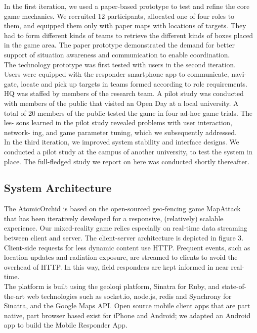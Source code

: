 In the first iteration, we used a paper-based prototype to test and refine the core game mechanics. We recruited 12 participants, allocated one of four roles to them, and equipped them only with paper maps with locations of targets. They had to form different kinds of teams to retrieve the different kinds of boxes placed in the game area. The paper prototype demonstrated the demand for better support of situation awareness and communication to enable coordination.\\

The technology prototype was first tested with users in the second iteration. Users were equipped with the responder smartphone app to communicate, navi- gate, locate and pick up targets in teams formed according to role requirements. HQ was staffed by members of the research team. A pilot study was conducted with members of the public that visited an Open Day at a local university. A total of 20 members of the public tested the game in four ad-hoc game trials. The les- sons learned in the pilot study revealed problems with user interaction, network- ing, and game parameter tuning, which we subsequently addressed.\\

In the third iteration, we improved system stability and interface designs. We conducted a pilot study at the campus of another university, to test the system in place. The full-fledged study we report on here was conducted shortly thereafter.\\

\subsection{System Architecture}
The AtomicOrchid is based on the open-sourced geo-fencing game MapAttack that has been iteratively developed for a responsive, (relatively) scalable experience. Our mixed-reality game relies especially on real-time data streaming between client and server. The client-server architecture is depicted in figure 3. Client-side requests for less dynamic content use HTTP. Frequent events, such as location updates and radiation exposure, are streamed to clients to avoid the overhead of HTTP. In this way, field responders are kept informed in near real-time.\\

The platform is built using the geoloqi platform, Sinatra for Ruby, and state-of-the-art web technologies such as socket.io, node.js, redis and Synchrony for Sinatra, and the Google Maps API. Open source mobile client apps that are part native, part browser based exist for iPhone and Android; we adapted an Android app to build the Mobile Responder App.\\


